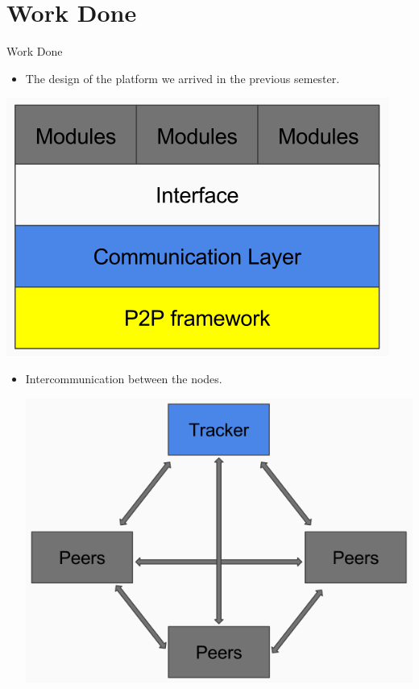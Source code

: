 \documentclass{beamer}
\begin{document}
\section{Work Done}
\begin{frame}{Work Done}
\begin{itemize}
\item The design of the platform we arrived in the previous semester.
\end{itemize}
\vspace{2ex}
\begin{center}
\includegraphics[scale=0.35]{pic3}
\end{center}
\end{frame}


\begin{frame}{}
\begin{itemize}
\item Intercommunication between the nodes.
\begin{center}
\includegraphics[scale=0.35]{pic}
\end{center}
\end{itemize}
\end{frame}
\end{document}

